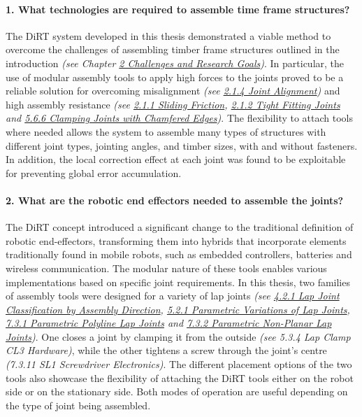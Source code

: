 	\paragraph{1. What technologies are required to assemble time frame structures?}

The DiRT system developed in this thesis demonstrated a viable method to overcome the challenges of assembling timber frame structures outlined in the introduction \textit{(see Chapter \ul{2 Challenges and Research Goals})}. In particular, the use of modular assembly tools to apply high forces to the joints proved to be a reliable solution for overcoming misalignment \textit{(see \ul{2.1.4 Joint Alignment}) }and high assembly resistance \textit{(see \ul{2.1.1 Sliding Friction}, \ul{2.1.2 Tight Fitting Joints} and \ul{5.6.6 Clamping Joints with Chamfered Edges})}. The flexibility to attach tools where needed allows the system to assemble many types of structures with different joint types, jointing angles, and timber sizes, with and without fasteners. In addition, the local correction effect at each joint was found to be exploitable for preventing global error accumulation.

    \paragraph{2. What are the robotic end effectors needed to assemble the joints?}

The DiRT concept introduced a significant change to the traditional definition of robotic end-effectors, transforming them into hybrids that incorporate elements traditionally found in mobile robots, such as embedded controllers, batteries and wireless communication. The modular nature of these tools enables various implementations based on specific joint requirements. In this thesis, two families of assembly tools were designed for a variety of lap joints \textit{(see \ul{4.2.1 Lap Joint Classification by Assembly Direction}, \ul{5.2.1 Parametric Variations of Lap Joints}, \ul{7.3.1 Parametric Polyline Lap Joints} and \ul{7.3.2 Parametric Non-Planar Lap Joints})}. One closes a joint by clamping it from the outside \textit{(see 5.3.4 Lap Clamp CL3 Hardware)}, while the other tightens a screw through the joint's centre \textit{(7.3.11 SL1 Screwdriver Electronics)}. The different placement options of the two tools also showcase the flexibility of attaching the DiRT tools either on the robot side or on the stationary side. Both modes of operation are useful depending on the type of joint being assembled.

